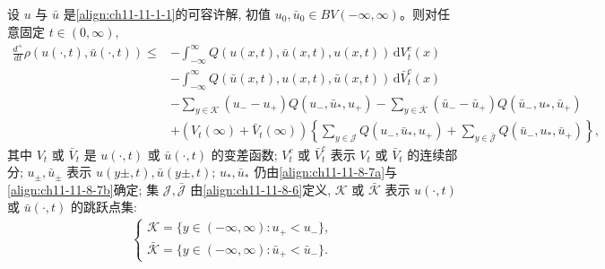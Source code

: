 \documentclass[../../main.tex]{subfiles}
\begin{document}
\begin{theorem}\label{theorem:ch11-11-8-3}
设 $u$ 与 $\bar u$ 是\eqref{align:ch11-11-1-1}的可容许解, 初值 $u_0,\bar u_0\in BV(-\infty,\infty)$。则对任意固定 $t\in(0,\infty)$,
\begin{align}
\frac{d^+}{dt}\rho(u(\cdot,t),\bar u(\cdot,t))
\leqslant&-\int_{-\infty}^\infty Q(u(x,t),\bar u(x,t),u(x,t))\,\mathrm{d}V_t^c(x)\nonumber\\
&-\int_{-\infty}^\infty Q(\bar u(x,t),u(x,t),\bar u(x,t))\,\mathrm{d}\bar V_t^c(x)\nonumber\\
&-\sum_{y\in\mathscr{K}}(u_--u_+)Q(u_-,\bar u_*,u_+)
-\sum_{y\in\bar{\mathscr{K}}}(\bar u_--\bar u_+)Q(\bar u_-,u_*,\bar u_+)\nonumber\\
&+(V_t(\infty)+\bar V_t(\infty))\left\{\sum_{y\in\mathscr{J}}Q(u_-,\bar u_*,u_+)
+\sum_{y\in\bar{\mathscr{J}}}Q(\bar u_-,u_*,\bar u_+)\right\},\label{align:ch11-11-8-12}
\end{align}
其中 $V_t$ 或 $\bar V_t$ 是 $u(\cdot,t)$ 或 $\bar u(\cdot,t)$ 的变差函数; $V_t^c$ 或 $\bar V_t^c$ 表示 $V_t$ 或 $\bar V_t$ 的连续部分; $u_\pm,\bar u_\pm$ 表示 $u(y\pm,t),\bar u(y\pm,t)$; $u_*,\bar u_*$ 仍由\eqref{align:ch11-11-8-7a}与\eqref{align:ch11-11-8-7b}确定; 集 $\mathscr{J},\bar{\mathscr{J}}$ 由\eqref{align:ch11-11-8-6}定义, $\mathscr{K}$ 或 $\bar{\mathscr{K}}$ 表示 $u(\cdot,t)$ 或 $\bar u(\cdot,t)$ 的跳跃点集:
\begin{align}
\begin{cases}
\mathscr{K}=\{y\in(-\infty,\infty):u_+<u_-\},\\
\bar{\mathscr{K}}=\{y\in(-\infty,\infty):\bar u_+<\bar u_-\}.
\end{cases}\label{align:ch11-11-8-13}
\end{align}
\end{theorem}
\end{document}
